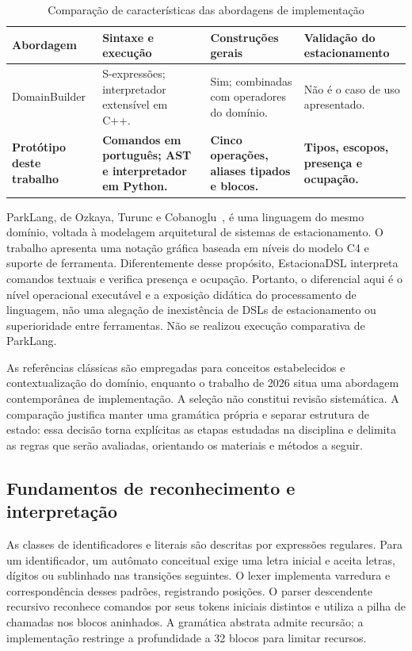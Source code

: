 \documentclass[conference,a4paper]{IEEEtran}
\begin{document}
\begin{table}[!t]
\centering
\footnotesize
\setlength{\tabcolsep}{4pt}
\renewcommand{\arraystretch}{1.15}
\caption{Comparação de características das abordagens de implementação}
\label{tab:t1}
\begin{tabularx}{\textwidth}{@{}p{}YYY@{}}
\toprule
\textbf{Abordagem} & \textbf{Sintaxe e execução} & \textbf{Construções gerais} & \textbf{Validação do estacionamento} \\
\midrule
DomainBuilder \cite{domainbuilder2026} & S-expressões; interpretador extensível em C++. & Sim; combinadas com operadores do domínio. & Não é o caso de uso apresentado. \\
\textbf{Protótipo deste trabalho} & \textbf{Comandos em português; AST e interpretador em Python.} & \textbf{Cinco operações, aliases tipados e blocos.} & \textbf{Tipos, escopos, presença e ocupação.} \\
\bottomrule
\end{tabularx}
\end{table}

ParkLang, de Ozkaya, Turunc e Cobanoglu~\cite{parklang2026}, é uma linguagem do mesmo domínio, voltada à modelagem arquitetural de sistemas de estacionamento. O trabalho apresenta uma notação gráfica baseada em níveis do modelo C4 e suporte de ferramenta. Diferentemente desse propósito, EstacionaDSL interpreta comandos textuais e verifica presença e ocupação. Portanto, o diferencial aqui é o nível operacional executável e a exposição didática do processamento de linguagem, não uma alegação de inexistência de DSLs de estacionamento ou superioridade entre ferramentas. Não se realizou execução comparativa de ParkLang.

As referências clássicas são empregadas para conceitos estabelecidos e contextualização do domínio, enquanto o trabalho de 2026 situa uma abordagem contemporânea de implementação. A seleção não constitui revisão sistemática. A comparação justifica manter uma gramática própria e separar estrutura de estado: essa decisão torna explícitas as etapas estudadas na disciplina e delimita as regras que serão avaliadas, orientando os materiais e métodos a seguir.


\subsection{Fundamentos de reconhecimento e interpretação}
As classes de identificadores e literais são descritas por expressões regulares. Para um identificador, um autômato conceitual exige uma letra inicial e aceita letras, dígitos ou sublinhado nas transições seguintes. O lexer implementa varredura e correspondência desses padrões, registrando posições. O parser descendente recursivo reconhece comandos por seus tokens iniciais distintos e utiliza a pilha de chamadas nos blocos aninhados. A gramática abstrata admite recursão; a implementação restringe a profundidade a 32 blocos para limitar recursos.
\end{document}
